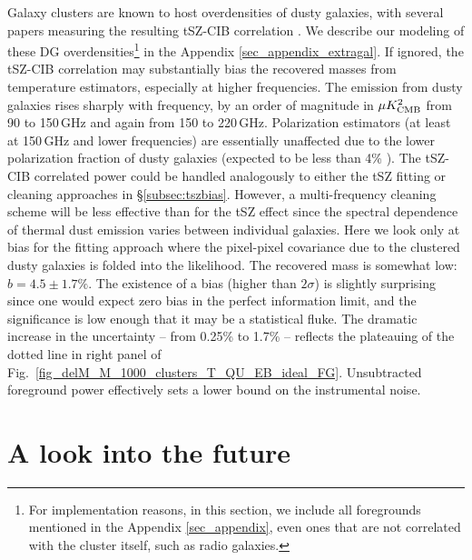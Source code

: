 Galaxy clusters are known to host overdensities of dusty galaxies, with several papers measuring the resulting tSZ-CIB correlation \citep{dunkley13, george15, planck16tsz-cib}.
We describe our modeling of these DG overdensities\footnote{For implementation reasons, in this section, we include all foregrounds mentioned in the Appendix \ref{sec_appendix}, even ones that are not correlated with the cluster itself, such as radio galaxies.} in the Appendix \ref{sec_appendix_extragal}.
If ignored, the tSZ-CIB correlation may substantially bias the recovered masses from temperature estimators, especially at higher frequencies.
The emission from dusty galaxies rises sharply with frequency, by an order of magnitude in $\mu K^2_{\rm CMB}$ from 90 to 150\,GHz and again from 150 to 220\,GHz.
Polarization estimators (at least at 150\,GHz and lower frequencies) are essentially unaffected due to the lower polarization fraction  of dusty galaxies (expected to be less than 4\% \citep{manzotti17,seiffert07}).
The tSZ-CIB correlated power could be handled analogously to either the tSZ fitting or cleaning approaches in \S\ref{subsec:tszbias}.
However, a multi-frequency cleaning scheme will be less effective than for the tSZ effect since the spectral dependence of thermal dust emission varies between individual galaxies.
Here we look only at bias for the fitting approach where the pixel-pixel covariance due to the clustered dusty galaxies is folded into the likelihood.
The recovered mass is somewhat low: $b=4.5 \pm 1.7\%$.
The existence of a bias (higher than $2\sigma$) is slightly surprising since one would expect zero bias in the perfect information limit, and the significance is low enough that it may be a statistical fluke.
The dramatic increase in the uncertainty -- from 0.25\% to 1.7\% -- reflects the plateauing of the dotted line in right panel of Fig.~\ref{fig_delM_M_1000_clusters_T_QU_EB_ideal_FG}.
Unsubtracted foreground power effectively sets a lower bound on the instrumental noise.

\section{A look into the future}
\label{sec_forecast}

